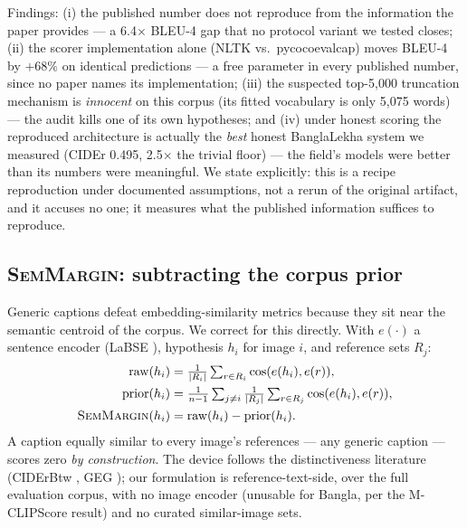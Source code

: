 \documentclass[11pt]{article}
\newcommand{\semmargin}{\textsc{SemMargin}}
\begin{document}
Findings: (i) the published number does not reproduce from the
information the paper provides --- a 6.4$\times$ BLEU-4 gap that no
protocol variant we tested closes; (ii) the scorer implementation
alone (NLTK vs.\ pycocoevalcap) moves BLEU-4 by $+68\%$ on identical
predictions --- a free parameter in every published number, since no
paper names its implementation; (iii) the suspected top-5{,}000
truncation mechanism is \emph{innocent} on this corpus (its fitted
vocabulary is only 5{,}075 words) --- the audit kills one of its own
hypotheses; and (iv) under honest scoring the reproduced architecture
is actually the \emph{best} honest BanglaLekha system we measured
(CIDEr 0.495, 2.5$\times$ the trivial floor) --- the field's models
were better than its numbers were meaningful. We state explicitly:
this is a recipe reproduction under documented assumptions, not a
rerun of the original artifact, and it accuses no one; it measures
what the published information suffices to reproduce.

\subsection{\semmargin{}: subtracting the corpus prior}
\label{sec:semmargin}

Generic captions defeat embedding-similarity metrics because they sit
near the semantic centroid of the corpus. We correct for this
directly. With $e(\cdot)$ a sentence encoder (LaBSE
\cite{labse2022}), hypothesis $h_i$ for image $i$, and reference sets
$R_j$:
\begin{align}
\mathrm{raw}(h_i) &= \tfrac{1}{|R_i|}\textstyle\sum_{r \in R_i} \cos(e(h_i), e(r)),\\
\mathrm{prior}(h_i) &= \tfrac{1}{n-1}\textstyle\sum_{j \neq i} \tfrac{1}{|R_j|}\sum_{r \in R_j} \cos(e(h_i), e(r)),\\
\semmargin(h_i) &= \mathrm{raw}(h_i) - \mathrm{prior}(h_i).
\end{align}
A caption equally similar to every image's references --- any generic
caption --- scores zero \emph{by construction}. The device follows the
distinctiveness literature (CIDErBtw \cite{ciderbtw2020}, GEG
\cite{geg2022}); our formulation is reference-text-side, over the full
evaluation corpus, with no image encoder (unusable for Bangla, per the
M-CLIPScore result) and no curated similar-image sets.
\end{document}
